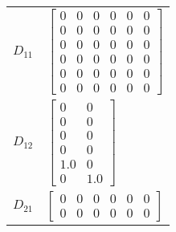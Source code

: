 \begin{tabular}{cl}
 $D_{11}$ & $\left[\begin{matrix}0 & 0 & 0 & 0 & 0 & 0\\0 & 0 & 0 & 0 & 0 & 0\\0 & 0 & 0 & 0 & 0 & 0\\0 & 0 & 0 & 0 & 0 & 0\\0 & 0 & 0 & 0 & 0 & 0\\0 & 0 & 0 & 0 & 0 & 0\end{matrix}\right]$               \\
 $D_{12}$ & $\left[\begin{matrix}0 & 0\\0 & 0\\0 & 0\\0 & 0\\1.0 & 0\\0 & 1.0\end{matrix}\right]$                                                                                                           \\
 $D_{21}$ & $\left[\begin{matrix}0 & 0 & 0 & 0 & 0 & 0\\0 & 0 & 0 & 0 & 0 & 0\end{matrix}\right]$                                                                                                           \\
\hline
\end{tabular}